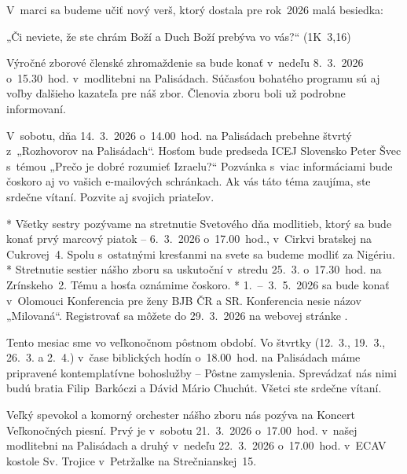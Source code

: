 \def\velkostpisma{9}
\def\velkostriadku{12}





V~marci sa budeme učiť nový verš, ktorý dostala pre rok~2026 malá besiedka:

„Či neviete, že ste chrám Boží a Duch Boží prebýva vo vás?“ (1K~3,16)


Výročné zborové členské zhromaždenie sa bude konať v~nedeľu 8.~3.~2026 o~15.30~hod. v~modlitebni na Palisádach. Súčasťou bohatého programu sú aj voľby ďalšieho kazateľa pre náš zbor. Členovia zboru boli už podrobne informovaní.


V~sobotu, dňa 14.~3.~2026 o~14.00~hod. na Palisádach prebehne štvrtý z~„Rozhovorov na Palisádach“. Hosťom bude predseda ICEJ Slovensko Peter Švec s~témou „Prečo je dobré rozumieť Izraelu?“ Pozvánka s~viac informáciami bude čoskoro aj vo vašich e-mailových schránkach. Ak vás táto téma zaujíma, ste srdečne vítaní. Pozvite aj svojich priateľov.


\begitems
* Všetky sestry pozývame na stretnutie Svetového dňa modlitieb, ktorý sa bude konať prvý marcový piatok -- 6.~3.~2026 o~17.00~hod., v~Cirkvi bratskej na Cukrovej~4. Spolu s~ostatnými kresťanmi na svete sa budeme modliť za Nigériu.
* Stretnutie sestier nášho zboru sa uskutoční v~stredu 25.~3. o~17.30~hod. na Zrínskeho~2. Tému a hosťa oznámime čoskoro.
* 1.~--~3.~5.~2026 sa bude konať v~Olomouci Konferencia pre ženy BJB ČR a SR. Konferencia nesie názov „Milovaná“. Registrovať sa môžete do 29.~3.~2026 na webovej stránke .
\enditems


Tento mesiac sme vo veľkonočnom pôstnom období. Vo štvrtky (12.~3., 19.~3., 26.~3. a 2.~4.) v~čase biblických hodín o~18.00~hod. na Palisádach máme pripravené kontemplatívne bohoslužby -- Pôstne zamyslenia. Sprevádzať nás nimi budú bratia Filip~Barkóczi a Dávid Mário Chuchút. Všetci ste srdečne vítaní.


Veľký spevokol a komorný orchester nášho zboru nás pozýva na Koncert Veľkonočných piesní. Prvý je v~sobotu 21.~3.~2026 o~17.00~hod. v~našej modlitebni na Palisádach a druhý v~nedeľu 22.~3.~2026 o~17.00~hod. v~ECAV kostole Sv. Trojice v~Petržalke na Strečnianskej~15.


